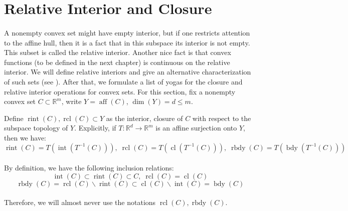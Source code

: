 \section{Relative Interior and Closure}
\label{sect:012}

\paragraph{}A nonempty convex set might have empty interior, but if one restricts attention to the affine hull, then it is a fact that in this subspace its interior is not empty. This subset is called the relative interior. Another nice fact is that convex functions (to be defined in the next chapter) is continuous on the relative interior. We will define relative interiors and give an alternative characterization of such sets (see ). After that, we formulate a list of yogas for the closure and relative interior operations for convex sets. For this section, fix a nonempty convex set $C\subset \mathbb{R}^m$, write $Y=\operatorname{aff}(C)$, $\dim(Y)=d\leq m$.

\begin{defn}
	\label{defn:012-relint}
	Define $\operatorname{rint}(C),\operatorname{rcl}(C)\subset Y$ as the interior, closure of $C$ with respect to the subspace topology of $Y$. Explicitly, if $T:\mathbb{R}^d\to \mathbb{R}^m$ is an affine surjection onto $Y$, then we have:
	\[
		\operatorname{rint}(C)=T (\operatorname{int}(T^{-1}(C))),\;
		\operatorname{rcl}(C)=T (\operatorname{cl}(T^{-1}(C))),\;
		\operatorname{rbdy}(C)=T (\operatorname{bdy}(T^{-1}(C)))
	\]
\end{defn}

\paragraph{}By definition, we have the following inclusion relations:
\[
	\operatorname{int}(C)\subset \operatorname{rint}(C)\subset C,\; \operatorname{rcl}(C)=\operatorname{cl}(C)
\]
\[
	\operatorname{rbdy}(C)=\operatorname{rcl}(C)\smallsetminus \operatorname{rint}(C)\subset \operatorname{cl}(C)\smallsetminus\operatorname{int}(C)=\operatorname{bdy}(C)
\]
\paragraph{}Therefore, we will almost never use the notations $\operatorname{rcl}(C),\operatorname{rbdy}(C)$.


